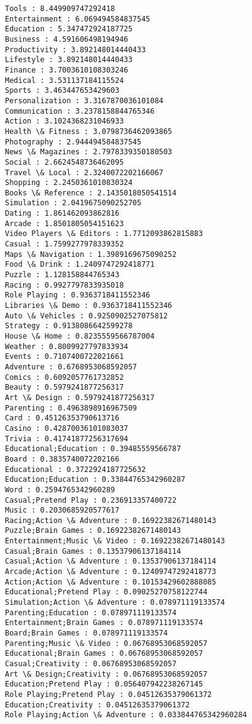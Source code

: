 \documentclass[11pt]{article}
\begin{document}
    \begin{Verbatim}[commandchars=\\\{\}]
Tools : 8.449909747292418
Entertainment : 6.069494584837545
Education : 5.347472924187725
Business : 4.591606498194946
Productivity : 3.892148014440433
Lifestyle : 3.892148014440433
Finance : 3.7003610108303246
Medical : 3.531137184115524
Sports : 3.463447653429603
Personalization : 3.3167870036101084
Communication : 3.2378158844765346
Action : 3.1024368231046933
Health \& Fitness : 3.0798736462093865
Photography : 2.944494584837545
News \& Magazines : 2.7978339350180503
Social : 2.6624548736462095
Travel \& Local : 2.3240072202166067
Shopping : 2.2450361010830324
Books \& Reference : 2.1435018050541514
Simulation : 2.0419675090252705
Dating : 1.861462093862816
Arcade : 1.8501805054151623
Video Players \& Editors : 1.7712093862815883
Casual : 1.7599277978339352
Maps \& Navigation : 1.3989169675090252
Food \& Drink : 1.2409747292418771
Puzzle : 1.128158844765343
Racing : 0.9927797833935018
Role Playing : 0.9363718411552346
Libraries \& Demo : 0.9363718411552346
Auto \& Vehicles : 0.9250902527075812
Strategy : 0.9138086642599278
House \& Home : 0.8235559566787004
Weather : 0.8009927797833934
Events : 0.7107400722021661
Adventure : 0.6768953068592057
Comics : 0.6092057761732852
Beauty : 0.5979241877256317
Art \& Design : 0.5979241877256317
Parenting : 0.4963898916967509
Card : 0.45126353790613716
Casino : 0.42870036101083037
Trivia : 0.41741877256317694
Educational;Education : 0.39485559566787
Board : 0.3835740072202166
Educational : 0.3722924187725632
Education;Education : 0.33844765342960287
Word : 0.2594765342960289
Casual;Pretend Play : 0.236913357400722
Music : 0.2030685920577617
Racing;Action \& Adventure : 0.16922382671480143
Puzzle;Brain Games : 0.16922382671480143
Entertainment;Music \& Video : 0.16922382671480143
Casual;Brain Games : 0.13537906137184114
Casual;Action \& Adventure : 0.13537906137184114
Arcade;Action \& Adventure : 0.12409747292418773
Action;Action \& Adventure : 0.10153429602888085
Educational;Pretend Play : 0.09025270758122744
Simulation;Action \& Adventure : 0.078971119133574
Parenting;Education : 0.078971119133574
Entertainment;Brain Games : 0.078971119133574
Board;Brain Games : 0.078971119133574
Parenting;Music \& Video : 0.06768953068592057
Educational;Brain Games : 0.06768953068592057
Casual;Creativity : 0.06768953068592057
Art \& Design;Creativity : 0.06768953068592057
Education;Pretend Play : 0.056407942238267145
Role Playing;Pretend Play : 0.04512635379061372
Education;Creativity : 0.04512635379061372
Role Playing;Action \& Adventure : 0.033844765342960284

\end{Verbatim}
\end{document}
